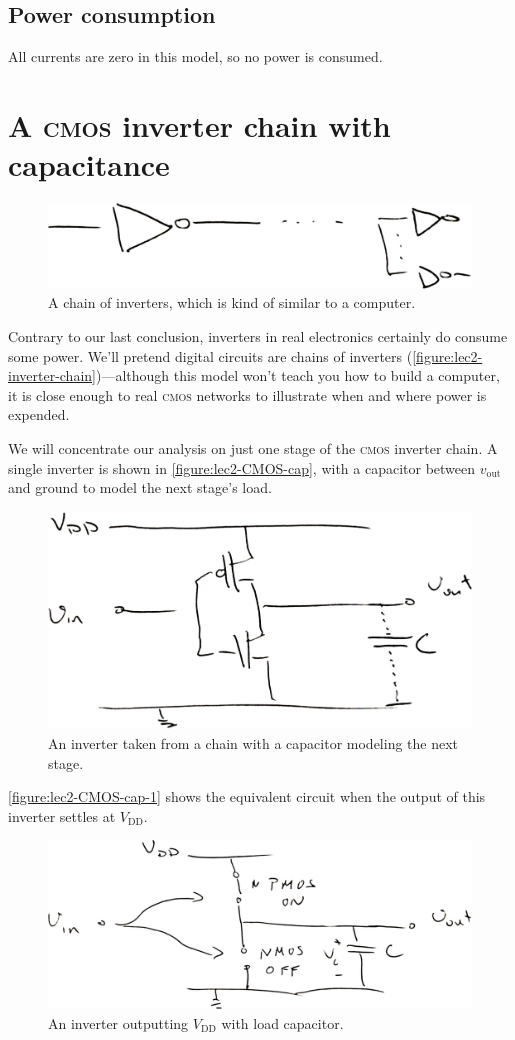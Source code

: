 \subsection{Power consumption}
All currents are zero in this model, so no power is consumed.

\section{A \textsc{cmos} inverter chain with capacitance}
\begin{figure}
  \centering
  \includegraphics[width=0.75\linewidth]{figures/inverter-chain}
  \caption{A chain of inverters, which is kind of similar to a computer.}
  \label{figure:lec2-inverter-chain}
\end{figure}
Contrary to our last conclusion, inverters in real electronics certainly do consume some power.
We'll pretend digital circuits are chains of inverters (\autoref{figure:lec2-inverter-chain})---although this model won't teach you how to build a computer, it is close enough to real \textsc{cmos} networks to illustrate when and where power is expended.

We will concentrate our analysis on just one stage of the \textsc{cmos} inverter chain.
A single inverter is shown in \autoref{figure:lec2-CMOS-cap},
with a capacitor between \(v_\text{out}\) and ground to model the
next stage's load.
\begin{figure}
  \centering
  \includegraphics[width=0.75\linewidth]{figures/CMOS-inverter-with-out-cap}
  \caption{An inverter taken from a chain with a capacitor modeling the next stage.}
  \label{figure:lec2-CMOS-cap}
\end{figure}
\autoref{figure:lec2-CMOS-cap-1} shows the equivalent circuit when the output of this inverter settles at \(V_\text{DD}\).
\begin{figure}
  \centering
  \includegraphics[width=0.75\linewidth]{figures/CMOS-cap-1}
  \caption{An inverter outputting \(V_\text{DD}\) with load capacitor.}
  \label{figure:lec2-CMOS-cap-1}
\end{figure}

